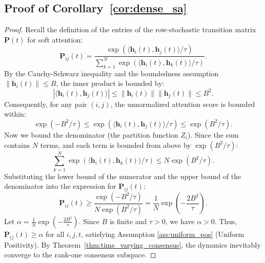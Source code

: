 \documentclass{article}
\theoremstyle{plain}
\theoremstyle{definition}
\theoremstyle{remark}
\begin{document}
\subsection{Proof of Corollary~\ref{cor:dense_sa}}
\label{proof:corollary37}

\begin{proof}
    Recall the definition of the entries of the row-stochastic transition matrix $\mathbf{P}(t)$ for soft attention:
    \begin{equation}
        \mathbf{P}_{ij}(t) = \frac{\exp(\langle \mathbf{h}_i(t), \mathbf{h}_j(t) \rangle / \tau)}{\sum_{k=1}^N \exp(\langle \mathbf{h}_i(t), \mathbf{h}_k(t) \rangle / \tau)}.
    \end{equation}
    By the Cauchy-Schwarz inequality and the boundedness assumption $\|\mathbf{h}_i(t)\| \le B$, the inner product is bounded by:
    \begin{equation}
        |\langle \mathbf{h}_i(t), \mathbf{h}_j(t) \rangle| \le \|\mathbf{h}_i(t)\| \|\mathbf{h}_j(t)\| \le B^2.
    \end{equation}
    Consequently, for any pair $(i,j)$, the unnormalized attention score is bounded within:
    \begin{equation}
        \exp(-B^2/\tau) \le \exp(\langle \mathbf{h}_i(t), \mathbf{h}_j(t) \rangle / \tau) \le \exp(B^2/\tau).
    \end{equation}
    Now we bound the denominator (the partition function $Z_i$). Since the sum contains $N$ terms, and each term is bounded from above by $\exp(B^2/\tau)$:
    \begin{equation}
        \sum_{k=1}^N \exp(\langle \mathbf{h}_i(t), \mathbf{h}_k(t) \rangle / \tau) \le N \exp(B^2/\tau).
    \end{equation}
    Substituting the lower bound of the numerator and the upper bound of the denominator into the expression for $\mathbf{P}_{ij}(t)$:
    \begin{equation}
        \mathbf{P}_{ij}(t) \ge \frac{\exp(-B^2/\tau)}{N \exp(B^2/\tau)} = \frac{1}{N} \exp\left(-\frac{2B^2}{\tau}\right).
    \end{equation}
    Let $\alpha = \frac{1}{N}\exp(-\frac{2B^2}{\tau})$. Since $B$ is finite and $\tau > 0$, we have $\alpha > 0$. Thus, $\mathbf{P}_{ij}(t) \ge \alpha$ for all $i, j, t$, satisfying Assumption \ref{ass:uniform_pos} (Uniform Positivity). By Theorem~\ref{thm:time_varying_consensus}, the dynamics inevitably converge to the rank-one consensus subspace.
\end{proof}
\end{document}
